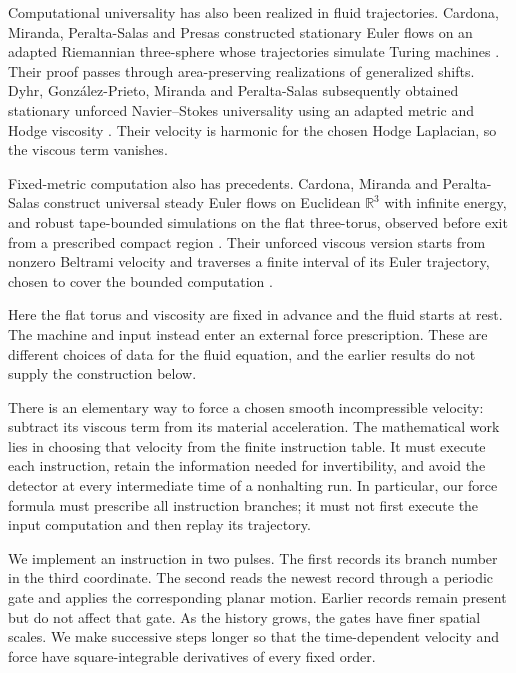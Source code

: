 \documentclass[11pt]{article}
\newcommand{\R}{\mathbb R}
\begin{document}
Computational universality has also been realized in fluid trajectories.
Cardona, Miranda, Peralta-Salas and Presas constructed stationary Euler
flows on an adapted Riemannian three-sphere whose trajectories simulate
Turing machines \cite{CMPP}. Their proof passes through area-preserving
realizations of generalized shifts. Dyhr, Gonz\'alez-Prieto, Miranda and
Peralta-Salas subsequently obtained stationary unforced Navier--Stokes universality
using an adapted metric and Hodge viscosity \cite{DGMP}. Their velocity
is harmonic for the chosen Hodge Laplacian, so the viscous term vanishes.

Fixed-metric computation also has precedents. Cardona, Miranda and
Peralta-Salas construct universal steady Euler flows on Euclidean $\R^3$
with infinite energy, and robust tape-bounded simulations on the flat
three-torus, observed before exit from a prescribed compact region
\cite[arXiv version~3, Theorems~1 and~26]{CMPBeltrami}.
Their unforced viscous version starts from nonzero Beltrami velocity
and traverses a finite interval of its Euler trajectory, chosen to cover
the bounded computation \cite[arXiv version~3, Remark~29]{CMPBeltrami}.

Here the flat torus and viscosity are fixed in advance and the fluid
starts at rest. The
machine and input instead enter an external force prescription. These
are different choices of data for the fluid equation, and the earlier
results do not supply the construction below.

There is an elementary way to force a chosen smooth incompressible
velocity: subtract its viscous term from its material acceleration.
The mathematical work lies in choosing that velocity from the finite
instruction table. It must execute each instruction, retain the information
needed for invertibility, and avoid the detector at every intermediate
time of a nonhalting run. In particular, our force formula must prescribe
all instruction branches; it must not first execute the input computation
and then replay its trajectory.

We implement an instruction in two pulses. The first records its branch
number in the third coordinate. The second reads the newest record through
a periodic gate and applies the corresponding planar motion. Earlier
records remain present but do not affect that gate. As the history grows,
the gates have finer spatial scales. We make successive steps longer so
that the time-dependent velocity and force have square-integrable
derivatives of every fixed order.
\end{document}
